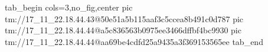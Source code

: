  
 
 
 
 

\qqSecOrig


\ifcmt
  tab_begin cols=3,no_fig,center
    pic tm://17_11_22.18.44.43@50e51a5b115aaf3c5ccea8b491c0d787
    pic tm://17_11_22.18.44.44@a5c836563b0975ee3466dffbf4bc9930
    pic tm://17_11_22.18.44.44@aa69be4cdfd25a9435a3f369153565ee
  tab_end
\fi

